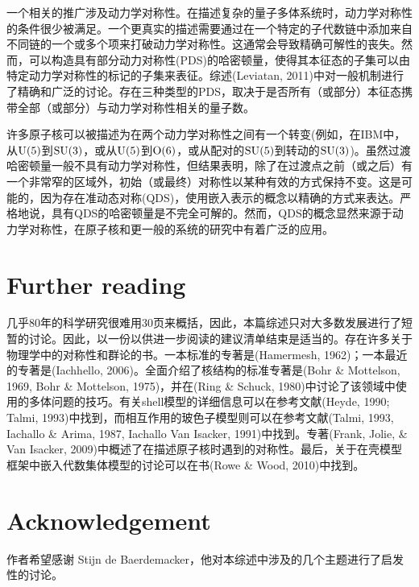 一个相关的推广涉及动力学对称性。在描述复杂的量子多体系统时，动力学对称性的条件很少被满足。一个更真实的描述需要通过在一个特定的子代数链中添加来自不同链的一个或多个项来打破动力学对称性。这通常会导致精确可解性的丧失。然而，可以构造具有部分动力对称性(PDS)的哈密顿量，使得其本征态的子集可以由特定动力学对称性的标记的子集来表征。综述(Leviatan, 2011)中对一般机制进行了精确和广泛的讨论。存在三种类型的PDS，取决于是否所有（或部分）本征态携带全部（或部分）与动力学对称性相关的量子数。

许多原子核可以被描述为在两个动力学对称性之间有一个转变(例如，在IBM中，从${\rm U(5)}$到${\rm SU(3)}$，或从${\rm U(5)}$到${\rm O(6)}$，或从配对的${\rm SU(5)}$到转动的${\rm SU(3)}$)。虽然过渡哈密顿量一般不具有动力学对称性，但结果表明，除了在过渡点之前（或之后）有一个非常窄的区域外，初始（或最终）对称性以某种有效的方式保持不变。这是可能的，因为存在准动态对称(QDS)，使用嵌入表示的概念以精确的方式来表达。严格地说，具有QDS的哈密顿量是不完全可解的。然而，QDS的概念显然来源于动力学对称性，在原子核和更一般的系统的研究中有着广泛的应用。

\section{Further reading}

几乎80年的科学研究很难用30页来概括，因此，本篇综述只对大多数发展进行了短暂的讨论。因此，以一份以供进一步阅读的建议清单结束是适当的。存在许多关于物理学中的对称性和群论的书。一本标准的专著是(Hamermesh, 1962)；一本最近的专著是(Iachhello, 2006)。全面介绍了核结构的标准专著是(Bohr \& Mottelson, 1969, Bohr \& Mottelson, 1975)，并在(Ring \& Schuck, 1980)中讨论了该领域中使用的多体问题的技巧。有关shell模型的详细信息可以在参考文献(Heyde, 1990; Talmi, 1993)中找到，而相互作用的玻色子模型则可以在参考文献(Talmi, 1993, Iachallo \& Arima, 1987, Iachallo Van Isacker, 1991)中找到。专著(Frank, Jolie, \& Van Isacker, 2009)中概述了在描述原子核时遇到的对称性。最后，关于在壳模型框架中嵌入代数集体模型的讨论可以在书(Rowe \& Wood, 2010)中找到。

\section{Acknowledgement}

作者希望感谢 Stijn de Baerdemacker，他对本综述中涉及的几个主题进行了启发性的讨论。